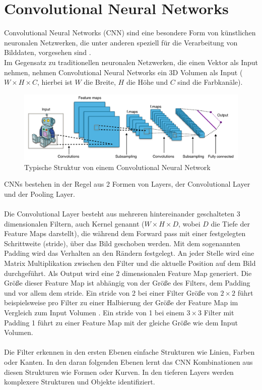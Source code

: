 \section{Convolutional Neural Networks}
Convolutional Neural Networks (\gls{CNN}) sind eine besondere Form von künstlichen neuronalen Netzwerken, die unter anderen speziell für 
die Verarbeitung von Bilddaten, vorgesehen sind \cite{convnet-erklaerung}.
\\
Im Gegensatz zu traditionellen neuronalen Netzwerken, die einen Vektor als Input nehmen, nehmen Convolutional Neural Networks ein 3D Volumen als Input
($ W \times H \times C $, hierbei ist $W$ die Breite, $H$ die Höhe und $C$ sind die Farbkanäle).

\begin{figure}[H]
  \centering
  \includegraphics[width=1\textwidth]{resources/cnn/typical_cnn.png}
  \caption{
    Typische Struktur von einem Convolutional Neural Network
    \cite{typical_cnn_img}
  }
  \label{image:typical_cnn_img}
\end{figure}


\gls{CNN}s bestehen in der Regel aus 2 Formen von \gls{Layer}s, der Convolutional \gls{Layer} und der Pooling Layer. 
\\
\\
Die Convolutional \gls{Layer} besteht aus mehreren hintereinander geschalteten 3 dimensionalen
Filtern, auch Kernel genannt ($ W \times H \times D$, wobei $D$ die Tiefe der Feature Maps darstellt), die während dem Forward pass mit 
einer festgelegten Schrittweite (\gls{stride}), über das Bild geschoben werden. Mit dem sogenannten Padding wird das Verhalten an den Rändern festgelegt.
An jeder Stelle wird eine Matrix Multiplikation zwischen den Filter und die aktuelle Position auf dem Bild durchgeführt. 
Als Output wird eine 2 dimensionalen Feature Map generiert. Die Größe dieser Feature Map ist abhängig 
von der Größe des Filters, dem Padding und vor allem dem \gls{stride}. Ein \gls{stride} von 2 bei einer Filter Größe von $ 2\times2 $ führt beispielsweise 
pro Filter zu einer Halbierung der Größe der Feature Map im Vergleich zum Input Volumen \cite{aufbau-funktion-convnet}.
Ein \gls{stride} von 1 bei einem $ 3\times3 $ Filter mit Padding 1 führt zu einer Feature Map mit der gleiche Größe wie dem Input Volumen.
\\
\\
Die Filter erkennen in den ersten Ebenen einfache Strukturen wie Linien, Farben oder Kanten. In den daran folgenden Ebenen lernt das CNN Kombinationen aus 
diesen Strukturen wie Formen oder Kurven. In den tieferen \gls{Layer}s werden komplexere Strukturen und Objekte identifiziert. 


